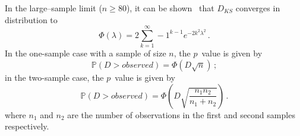\documentclass[codesnippet]{jss}
\begin{document}

In the large--sample limit ($n \geq 80$), it can be shown~\citep{Kendall1946} that $D_{KS}$ converges in distribution to
\begin{equation} \label{eq:1}
\Phi(\lambda) = 2 \sum_{k=1}^{\infty} -1^{k-1}e^{-2k^2\lambda^2} \,.
\end{equation}
%
In the one-sample case with a sample of size $n$, the $p$~value is given by
\begin{equation} \label{eq:2}
\mathbb{P}(D > observed) = \Phi ( D\sqrt{n})\,;
\end{equation}
in the two-sample case, the $p$~value is given by
%
\begin{equation} \label{eq:3}
\mathbb{P}(D > observed) = \Phi \left( D\sqrt{\frac{n_1n_2}{n_1+n_2}} \right)\,.
\end{equation}
%
where $n_1$ and $n_2$ are the number of observations in the first and second samples respectively. 
\end{document}
